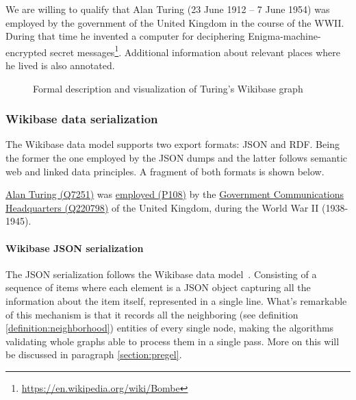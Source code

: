 \begin{example}
    \label{example:knowledgeGraph}
    We are willing to qualify that Alan Turing (23 June 1912 -- 7 June 1954) was employed by the government of the United Kingdom in the course of the WWII. During that time he invented a computer for deciphering Enigma-machine-encrypted secret messages\footnote{\url{https://en.wikipedia.org/wiki/Bombe}}. Additional information about relevant places where he lived is also annotated.
\end{example}



\begin{figure}[H]
    \centering
    
    \caption[Formal description and visualization of Turing's Wikibase graph]{Formal description and visualization of Turing's Wikibase graph}
\end{figure}

\subsubsection{Wikibase data serialization}
\label{section:wikibase:serialization}

The Wikibase data model supports two export formats: JSON and RDF. Being the former the one employed by the JSON dumps and the latter follows semantic web and linked data principles. A fragment of both formats is shown below.

\begin{example}
    \href{https://www.wikidata.org/wiki/Q7251}{Alan Turing (Q7251)} was \href{https://www.wikidata.org/wiki/Property:P108}{employed (P108)} by the \href{https://www.wikidata.org/wiki/Q220798}{Government Communications Headquarters (Q220798)} of the United Kingdom, during the World War II (1938-1945).
\end{example}

\paragraph{Wikibase JSON serialization}


The JSON serialization follows the Wikibase data model~\cite{https://doi.org/10.48550/arxiv.2110.11709}. Consisting of a sequence of items where each element is a JSON object capturing all the information about the item itself, represented in a single line. What's remarkable of this mechanism is that it records all the neighboring (see definition \ref{definition:neighborhood}) entities of every single node, making the algorithms validating whole graphs able to process them in a single pass. More on this will be discussed in paragraph \ref{section:pregel}.

